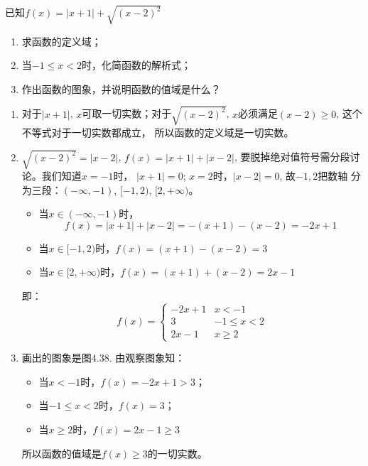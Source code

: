 \begin{example}
    已知$f(x)=|x+1|+\sqrt{(x-2)^2}$
\begin{enumerate}
    \item 求函数的定义域；
    \item 当$-1\le x<2$时，化简函数的解析式；
    \item 作出函数的图象，并说明函数的值域是什么？
\end{enumerate}
\end{example}    

\begin{solution}
\begin{enumerate}
    \item 对于$|x+1|$, $x$可取一切实数；对于$\sqrt{(x-2)^2}$,
    $x$必须满足$(x-2)\ge 0$, 这个不等式对于一切实数都成立，
    所以函数的定义域是一切实数。
\item $\sqrt{(x-2)^2}=|x-2|$, $f(x)=|x+1|+|x-2|$,
    要脱掉绝对值符号需分段讨论。我们知道$x=-1$时，
    $|x+1|=0$; $x=2$时，$|x-2|=0$, 故$-1,2$把数轴
    分为三段：$(-\infty,-1)$, $[-1,2)$, $[2,+\infty)$。
\begin{itemize}
    \item 当$x\in (-\infty,-1)$时，
    $$f(x)=|x+1|+|x-2|=-(x+1)-(x-2)=-2x+1$$
    \item 当$x\in[-1,2)$时，$f(x)=(x+1)-(x-2)=3$
  \item   当$x\in [2,+\infty)$时，$f(x)=(x+1)+(x-2)=2x-1$
\end{itemize}
即：\[f(x)=\begin{cases}
   -2x+1  & x<-1\\
   3& -1\le x<2\\
   2x-1 & x\ge 2 
\end{cases}\]
\item 画出的图象是图4.38.
由观察图象知：
\begin{itemize}
    \item 当$x<-1$时，$f(x)=-2x+1>3$；
    \item 当$-1\le x<2$时，$f(x)=3$；
    \item 当$x\ge 2$时，$f(x)=2x-1\ge 3$
\end{itemize}
所以函数的值域是$f(x)\ge 3$的一切实数。
\end{enumerate}

\begin{figure}[htp]
    \centering
{}
    \caption{}
\end{figure}


\end{solution}

